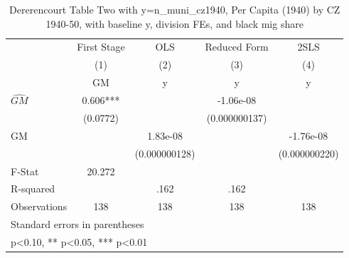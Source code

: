 \begin{table}[htbp]\centering
\def\sym#1{\ifmmode^{#1}\else\(^{#1}\)\fi}
\caption{Dererencourt Table Two with y=n\_muni\_cz1940, Per Capita (1940) by CZ 1940-50, with baseline y, division FEs, and black mig share}
\begin{tabular}{l*{4}{c}}
\toprule
                    & First Stage   &         OLS   &Reduced Form   &        2SLS   \\
                    &\multicolumn{1}{c}{(1)}&\multicolumn{1}{c}{(2)}&\multicolumn{1}{c}{(3)}&\multicolumn{1}{c}{(4)}\\
                    &\multicolumn{1}{c}{GM}&\multicolumn{1}{c}{y}&\multicolumn{1}{c}{y}&\multicolumn{1}{c}{y}\\
\midrule
$\hat{GM}$          &       0.606***&               &   -1.06e-08   &               \\
                    &    (0.0772)   &               &(0.000000137)   &               \\
\addlinespace
GM                  &               &    1.83e-08   &               &   -1.76e-08   \\
                    &               &(0.000000128)   &               &(0.000000220)   \\
\midrule
F-Stat              &      20.272   &               &               &               \\
R-squared           &               &        .162   &        .162   &               \\
Observations        &         138   &         138   &         138   &         138   \\
\bottomrule
\multicolumn{5}{l}{\footnotesize Standard errors in parentheses}\\
\multicolumn{5}{l}{\footnotesize * p<0.10, ** p<0.05, *** p<0.01}\\
\end{tabular}
\end{table}
